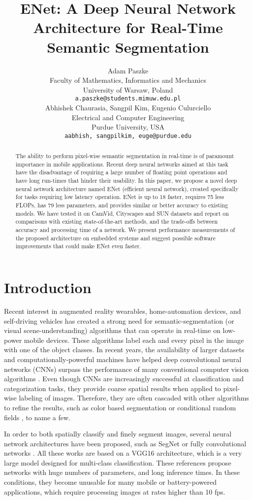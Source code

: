 \documentclass{article}
\title{ENet: A Deep Neural Network Architecture for Real-Time Semantic Segmentation}
\author{
  Adam Paszke\\
  Faculty of Mathematics, Informatics and Mechanics\\
  University of Warsaw, Poland \\
  \texttt{a.paszke@students.mimuw.edu.pl} \\
  \And
  Abhishek Chaurasia, Sangpil Kim, Eugenio Culurciello\\
  Electrical and Computer Engineering\\
  Purdue University, USA\\
  \texttt{aabhish, sangpilkim, euge@purdue.edu}\\
}
\begin{document}
\maketitle

\begin{abstract}
The ability to perform pixel-wise semantic segmentation in real-time is of paramount importance in mobile applications.
Recent deep neural networks aimed at this task have the disadvantage of requiring a large number of floating point operations and have long run-times that hinder their usability.
In this paper, we propose a novel deep neural network architecture named ENet (efficient neural network), created specifically for tasks requiring low latency operation.
ENet is up to 18 faster, requires 75 less FLOPs, has 79 less parameters, and provides similar or better accuracy to existing models.
We have tested it on CamVid, Cityscapes and SUN datasets and report on comparisons with existing state-of-the-art methods, and the trade-offs between accuracy and processing time of a network.
We present performance measurements of the proposed architecture on embedded systems and suggest possible software improvements that could make ENet even faster.
\end{abstract}

\section{Introduction}

Recent interest in augmented reality wearables, home-automation devices, and self-driving vehicles has created a strong need for semantic-segmentation (or visual scene-understanding) algorithms that can operate in real-time on low-power mobile devices.
These algorithms label each and every pixel in the image with one of the object classes.
In recent years, the availability of larger datasets and computationally-powerful machines have helped deep convolutional neural networks (CNNs) \cite{lecun1998cnn,alex2012,karen14,christian15} surpass the performance of many conventional computer vision algorithms \cite{jamie09,perr2010,vande2011}.
Even though CNNs are increasingly successful at classification and categorization tasks, they provide coarse spatial results when applied to pixel-wise labeling of images.
Therefore, they are often cascaded with other algorithms to refine the results, such as color based segmentation \cite{clement13} or conditional random fields \cite{liang14}, to name a few.

In order to both spatially classify and finely segment images, several neural network architectures have been proposed, such as SegNet \cite{badrinarayanan15basic,badrinarayanan15} or fully convolutional networks \cite{long15}.
All these works are based on a VGG16 \cite{simonyan14} architecture, which is a very large model designed for multi-class classification.
These references propose networks with huge numbers of parameters, and long inference times.
In these conditions, they become unusable for many mobile or battery-powered applications, which require processing images at rates higher than 10 fps.
\end{document}
